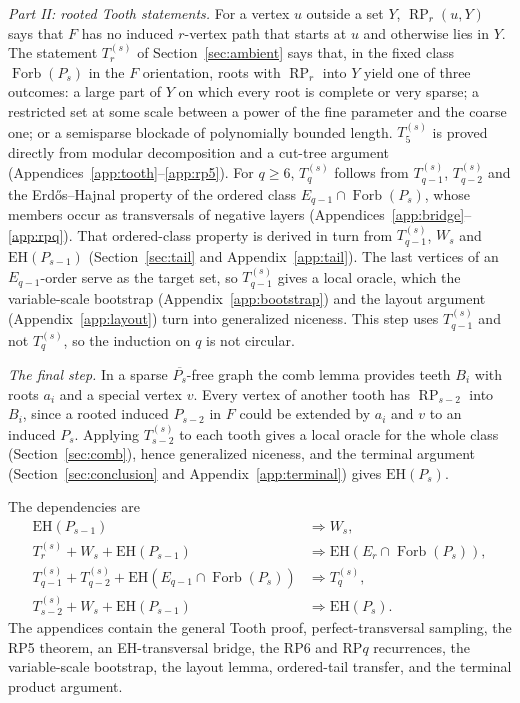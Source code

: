 \documentclass[11pt,a4paper]{article}
\theoremstyle{definition}
\theoremstyle{remark}
\numberwithin{equation}{section}
\DeclareMathOperator{\Forb}{Forb}
\DeclareMathOperator{\RP}{RP}
\newcommand{\EH}{\mathrm{EH}}
\begin{document}
\emph{Part II: rooted Tooth statements.} For a vertex \(u\) outside a set \(Y\), \(\RP_r(u,Y)\) says that \(F\) has no induced \(r\)-vertex path that starts at \(u\) and otherwise lies in \(Y\). The statement \(T_r^{(s)}\) of Section~\ref{sec:ambient} says that, in the fixed class \(\Forb(P_s)\) in the \(F\) orientation, roots with \(\RP_r\) into \(Y\) yield one of three outcomes: a large part of \(Y\) on which every root is complete or very sparse; a restricted set at some scale between a power of the fine parameter and the coarse one; or a semisparse blockade of polynomially bounded length. \(T_5^{(s)}\) is proved directly from modular decomposition and a cut-tree argument (Appendices~\ref{app:tooth}--\ref{app:rp5}). For \(q\ge6\), \(T_q^{(s)}\) follows from \(T_{q-1}^{(s)}\), \(T_{q-2}^{(s)}\) and the Erd\H{o}s--Hajnal property of the ordered class \(E_{q-1}\cap\Forb(P_s)\), whose members occur as transversals of negative layers (Appendices~\ref{app:bridge}--\ref{app:rpq}). That ordered-class property is derived in turn from \(T_{q-1}^{(s)}\), \(W_s\) and \(\EH(P_{s-1})\) (Section~\ref{sec:tail} and Appendix~\ref{app:tail}). The last vertices of an \(E_{q-1}\)-order serve as the target set, so \(T_{q-1}^{(s)}\) gives a local oracle, which the variable-scale bootstrap (Appendix~\ref{app:bootstrap}) and the layout argument (Appendix~\ref{app:layout}) turn into generalized niceness. This step uses \(T_{q-1}^{(s)}\) and not \(T_q^{(s)}\), so the induction on \(q\) is not circular.

\emph{The final step.} In a sparse \(\overline{P_s}\)-free graph the comb lemma provides teeth \(B_i\) with roots \(a_i\) and a special vertex \(v\). Every vertex of another tooth has \(\RP_{s-2}\) into \(B_i\), since a rooted induced \(P_{s-2}\) in \(F\) could be extended by \(a_i\) and \(v\) to an induced \(P_s\). Applying \(T_{s-2}^{(s)}\) to each tooth gives a local oracle for the whole class (Section~\ref{sec:comb}), hence generalized niceness, and the terminal argument (Section~\ref{sec:conclusion} and Appendix~\ref{app:terminal}) gives \(\EH(P_s)\).

The dependencies are
\begin{align*}
\EH(P_{s-1})&\Longrightarrow W_s,\\
T_r^{(s)}+W_s+\EH(P_{s-1})
 &\Longrightarrow \EH(E_r\cap\Forb(P_s)),\\
T_{q-1}^{(s)}+T_{q-2}^{(s)}+\EH(E_{q-1}\cap\Forb(P_s))
 &\Longrightarrow T_q^{(s)},\\
T_{s-2}^{(s)}+W_s+\EH(P_{s-1})
 &\Longrightarrow \EH(P_s).
\end{align*}
The appendices contain the general Tooth proof, perfect-transversal sampling, the RP5 theorem, an EH-transversal bridge, the RP6 and RP\(q\) recurrences, the variable-scale bootstrap, the layout lemma, ordered-tail transfer, and the terminal product argument.
\end{document}
